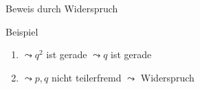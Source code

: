 \begin{frame}[fragile]{Beweis durch Widerspruch}
{\begin{exampleblock}{Beispiel}
\begin{enumerate}
            \item<9-|handout:1> $\leadsto q^2$ ist gerade \alert<10|handout:0>{$\leadsto q$ ist gerade}
            \item<10-|handout:1> \alert<10|handout:0>{$\leadsto p,q$ nicht teilerfremd} \alert<11|handout:0>{$\leadsto$ Widerspruch}
        \end{enumerate}
    \end{exampleblock}
}
\end{frame}
